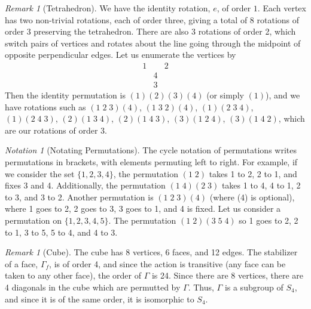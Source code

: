 \documentclass[12pt]{article}
\theoremstyle{definition}
\theoremstyle{remark}
\newtheorem{rmk}[thm]{Remark}
\newtheorem{nota}[thm]{Notation}
\numberwithin{equation}{section}
\begin{document}
\begin{rmk}[Tetrahedron]
        We have the identity rotation, $e$, of order $1$. Each vertex has two non-trivial rotations, each of order three, giving a total of 8 rotations of order $3$ preserving the tetrahedron. There are also 3 rotations of order 2, which switch pairs of vertices and rotates about the line going through the midpoint of opposite perpendicular edges. Let us enumerate the vertices by \begin{equation*}
                        \begin{array}{ccc} 1 & & 2 \\ & 4 & \\ & 3 & \end{array}
        \end{equation*}
        Then the identity permutation is $(1)(2)(3)(4)$ (or simply $(1)$), and we have rotations such as $(1\;2\;3)(4)$, $(1\;3\;2)(4)$, $(1)(2\;3\;4)$, $(1)(2\;4\;3)$, $(2)(1\;3\;4)$, $(2)(1\;4\;3)$, $(3)(1\;2\;4)$, $(3)(1\;4\;2)$, which are our rotations of order 3.
\end{rmk}


\vspace{15pt}

\begin{nota}[Notating Permutations]
        The cycle notation of permutations writes permutations in brackets, with elements permuting left to right. For example, if we consider the set $\{1,2,3,4\}$, the permutation $(1\;2)$ takes 1 to 2, 2 to 1, and fixes 3 and 4. Additionally, the permutation $(1\;4)(2\;3)$ takes 1 to 4, 4 to 1, 2 to 3, and 3 to 2. Another permutation is $(1\;2\;3)(4)$ (where (4) is optional), where 1 goes to 2, 2 goes to 3, 3 goes to 1, and 4 is fixed. Let us consider a permutation on $\{1,2,3,4,5\}$. The permutation $(1\;2)(3\;5\;4)$ so 1 goes to 2, 2 to 1, 3 to 5, 5 to 4, and 4 to 3.
\end{nota}

\vspace{15pt}

\begin{rmk}[Cube]
        The cube has 8 vertices, 6 faces, and 12 edges. The stabilizer of a face, $\Gamma_f$, is of order 4, and since the action is transitive (any face can be taken to any other face), the order of $\Gamma$ is 24. Since there are 8 vertices, there are 4 diagonals in the cube which are permutted by $\Gamma$. Thus, $\Gamma$ is a subgroup of $S_4$, and since it is of the same order, it is isomorphic to $S_4$.
\end{rmk}
\end{document}
